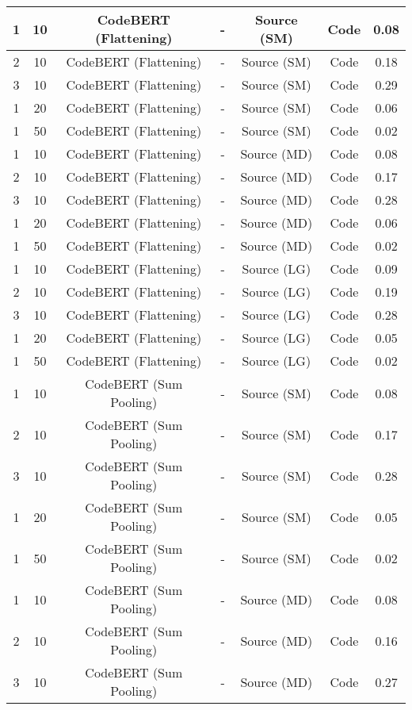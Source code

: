 \begin{longtable}{|c|c|c|c|c|c|c|}
\hline
1 & 10 & CodeBERT (Flattening) & - & Source (SM) & Code & 0.08 \\
\hline
2 & 10 & CodeBERT (Flattening) & - & Source (SM) & Code & 0.18 \\
\hline
3 & 10 & CodeBERT (Flattening) & - & Source (SM) & Code & 0.29 \\
\hline
1 & 20 & CodeBERT (Flattening) & - & Source (SM) & Code & 0.06 \\
\hline
1 & 50 & CodeBERT (Flattening) & - & Source (SM) & Code & 0.02 \\
\hline
1 & 10 & CodeBERT (Flattening) & - & Source (MD) & Code & 0.08 \\
\hline
2 & 10 & CodeBERT (Flattening) & - & Source (MD) & Code & 0.17 \\
\hline
3 & 10 & CodeBERT (Flattening) & - & Source (MD) & Code & 0.28 \\
\hline
1 & 20 & CodeBERT (Flattening) & - & Source (MD) & Code & 0.06 \\
\hline
1 & 50 & CodeBERT (Flattening) & - & Source (MD) & Code & 0.02 \\
\hline
1 & 10 & CodeBERT (Flattening) & - & Source (LG) & Code & 0.09 \\
\hline
2 & 10 & CodeBERT (Flattening) & - & Source (LG) & Code & 0.19 \\
\hline
3 & 10 & CodeBERT (Flattening) & - & Source (LG) & Code & 0.28 \\
\hline
1 & 20 & CodeBERT (Flattening) & - & Source (LG) & Code & 0.05 \\
\hline
1 & 50 & CodeBERT (Flattening) & - & Source (LG) & Code & 0.02 \\
\hline
1 & 10 & CodeBERT (Sum Pooling) & - & Source (SM) & Code & 0.08 \\
\hline
2 & 10 & CodeBERT (Sum Pooling) & - & Source (SM) & Code & 0.17 \\
\hline
3 & 10 & CodeBERT (Sum Pooling) & - & Source (SM) & Code & 0.28 \\
\hline
1 & 20 & CodeBERT (Sum Pooling) & - & Source (SM) & Code & 0.05 \\
\hline
1 & 50 & CodeBERT (Sum Pooling) & - & Source (SM) & Code & 0.02 \\
\hline
1 & 10 & CodeBERT (Sum Pooling) & - & Source (MD) & Code & 0.08 \\
\hline
2 & 10 & CodeBERT (Sum Pooling) & - & Source (MD) & Code & 0.16 \\
\hline
3 & 10 & CodeBERT (Sum Pooling) & - & Source (MD) & Code & 0.27 \\

\end{longtable}
